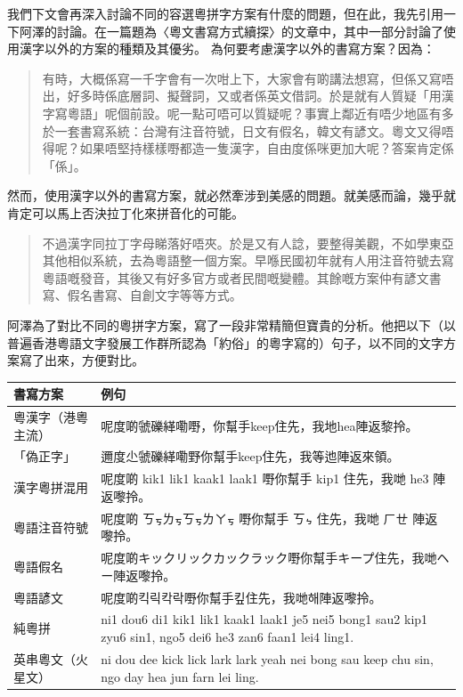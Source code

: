\documentclass[a5paper, 10pt, openany]{book} %
\begin{document}
我們下文會再深入討論不同的容選粵拼字方案有什麼的問題，但在此，我先引用一下阿澤的討論。在一篇題為〈粵文書寫方式續探〉的文章中，其中一部分討論了使用漢字以外的方案的種類及其優劣。 為何要考慮漢字以外的書寫方案？因為：
\begin{quotation}
  有時，大概係寫一千字會有一次咁上下，大家會有啲講法想寫，但係又寫唔出，好多時係底層詞、擬聲詞，又或者係英文借詞。於是就有人質疑「用漢字寫粵語」呢個前設。呢一點可唔可以質疑呢？事實上鄰近有唔少地區有多於一套書寫系統：台灣有注音符號，日文有假名，韓文有諺文。粵文又得唔得呢？如果唔堅持樣樣嘢都造一隻漢字，自由度係咪更加大呢？答案肯定係「係」。
  
\end{quotation}

然而，使用漢字以外的書寫方案，就必然牽涉到美感的問題。就美感而論，幾乎就肯定可以馬上否決拉丁化來拼音化的可能。

\begin{quotation}
  不過漢字同拉丁字母睇落好唔夾。於是又有人諗，要整得美觀，不如學東亞其他相似系統，去為粵語整一個方案。早喺民國初年就有人用注音符號去寫粵語嘅發音，其後又有好多官方或者民間嘅變體。其餘嘅方案仲有諺文書寫、假名書寫、自創文字等等方式。 
  
\end{quotation}

阿澤為了對比不同的粵拼字方案，寫了一段非常精簡但寶貴的分析。他把以下（以普遍香港粵語文字發展工作群所認為「約俗」的粵字寫的）句子，以不同的文字方案寫了出來，方便對比。



\begin{longtable}{|l|p{7cm}|}
  \hline
  \textbf{書寫方案} & \textbf{例句} \\
  \hline
  \jcz{}
  \batang{}
  粵漢字（港粵主流） & 呢度啲虢礫緙嘞嘢，你幫手keep住先，我地hea陣返黎拎。 \\
  \hline
  「偽正字」 & 邇度尐虢礫緙嘞野你幫手keep住先，我等迆陣返來領。 \\
  \hline
  漢字粵拼混用 & 呢度啲 kik1 lik1 kaak1 laak1 嘢你幫手 kip1 住先，我哋 he3 陣返嚟拎。 \\
  \hline
  粵語注音符號 & 呢度啲 ㄎㆶㄌㆶㄎㆶㄌㄚㆶ 嘢你幫手 ㄎㆴ 住先，我哋 ㄏㄝ 陣返嚟拎。 \\
  \hline
  粵語假名 & 呢度啲キックリックカックラック嘢你幫手キープ住先，我哋ヘー陣返嚟拎。 \\
  \hline
  粵語諺文 & 呢度啲{\koreanfont 킥릭칵락}嘢你幫手{\koreanfont 킾}住先，我哋{\koreanfont 해}陣返嚟拎。 \\
  \hline
  純粵拼 & ni1 dou6 di1 kik1 lik1 kaak1 laak1 je5 nei5 bong1 sau2 kip1 zyu6 sin1, ngo5 dei6 he3 zan6 faan1 lei4 ling1. \\
  \hline
  英串粵文（火星文） & ni dou dee kick lick lark lark yeah nei bong sau keep chu sin, ngo day hea jun farn lei ling. \\
  \hline
  \end{longtable}
\end{document}

